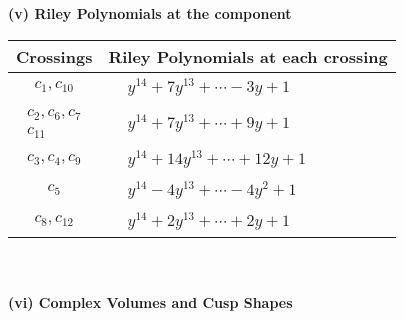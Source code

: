 \documentclass[1p]{elsarticle_modified}
\theoremstyle{definition}
\begin{document}
\newpage\renewcommand{\arraystretch}{1}
\flushleft \textbf{(v) Riley Polynomials at the component}\newline \\
\begin{tabular}{m{50pt}|m{274pt}}
Crossings & \hspace{64pt}Riley Polynomials at each crossing \\
\hline $$\begin{aligned}c_{1},c_{10}\end{aligned}$$&$\begin{aligned}
&y^{14}+7 y^{13}+\cdots-3 y+1
\end{aligned}$\\
\hline $$\begin{aligned}c_{2},c_{6},c_{7}\\c_{11}\end{aligned}$$&$\begin{aligned}
&y^{14}+7 y^{13}+\cdots+9 y+1
\end{aligned}$\\
\hline $$\begin{aligned}c_{3},c_{4},c_{9}\end{aligned}$$&$\begin{aligned}
&y^{14}+14 y^{13}+\cdots+12 y+1
\end{aligned}$\\
\hline $$\begin{aligned}c_{5}\end{aligned}$$&$\begin{aligned}
&y^{14}-4 y^{13}+\cdots-4 y^2+1
\end{aligned}$\\
\hline $$\begin{aligned}c_{8},c_{12}\end{aligned}$$&$\begin{aligned}
&y^{14}+2 y^{13}+\cdots+2 y+1
\end{aligned}$\\
\hline
\end{tabular}\\~\\
\newpage\flushleft \textbf{(vi) Complex Volumes and Cusp Shapes}
\end{document}
